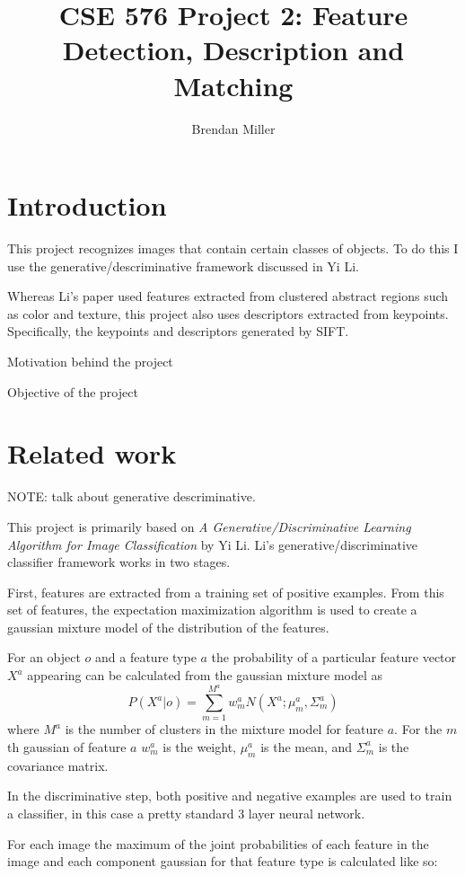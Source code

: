 \documentclass[11pt]{article}
\title{CSE 576 Project 2: Feature Detection, Description and Matching}
\author{Brendan Miller}
\begin{document}
\maketitle
\section{Introduction}

This project recognizes images that contain certain classes of
objects. To do this I use the generative/descriminative framework
discussed in Yi Li\cite{gendesc}.

Whereas Li's paper used features extracted from clustered abstract
regions such as color and texture, this project also uses descriptors
extracted from keypoints. Specifically, the keypoints and descriptors
generated by SIFT.

Motivation behind the project

Objective of the project

\section{Related work}

NOTE: talk about generative descriminative.

This project is primarily based on \emph{A Generative/Discriminative
  Learning Algorithm for Image Classification} by Yi
Li\cite{gendesc}. Li's generative/discriminative classifier framework
works in two stages.

First, features are extracted from a training set of positive
examples. From this set of features, the expectation maximization
algorithm is used to create a gaussian mixture model of the
distribution of the features.

For an object $o$ and a feature type $a$ the probability of a
particular feature vector $X^a$ appearing can be calculated from the
gaussian mixture model as
\begin{equation*}
  P(X^a|o) = \sum_{m=1}^{M^a} w^a_m N(X^a; \mu^a_m, \Sigma^a_m)
\end{equation*}
where $M^a$ is the number of clusters in the mixture model for feature
$a$. For the $m$th gaussian of feature $a$ $w^a_m$ is the weight,
$\mu^a_m$ is the mean, and $\Sigma^a_m$ is the covariance matrix.

In the discriminative step, both positive and negative examples are
used to train a classifier, in this case a pretty standard 3 layer
neural network.

For each image the maximum of the joint probabilities of each feature
in the image and each component gaussian for that feature type is
calculated like so:
\end{document}
